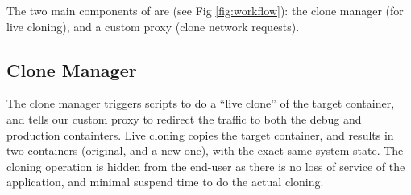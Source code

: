 The two main components of \parikshan are (see Fig \ref{fig:workflow}): the clone manager (for live cloning), and a custom proxy (clone network requests).


\subsection{Clone Manager} 
\label{sec:CloneManager}

The clone manager triggers scripts to do a ``live clone'' of the target container, and tells our custom proxy to redirect the traffic to both the debug and production containters. 
Live cloning copies the target container, and results in two containers (original, and a new one), with the exact same system state.
The cloning operation is hidden from the end-user as there is no loss of service of the application, and minimal suspend time to do the actual cloning.

